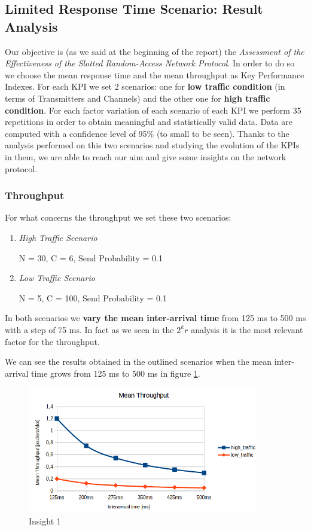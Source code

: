 \subsection{Limited Response Time Scenario: Result Analysis}
Our objective is (as we said at the beginning of the report) the \textit{Assessment of the Effectiveness of the Slotted Random-Access Network Protocol}. In order to do so we choose the mean response time and the mean throughput as Key Performance Indexes. For each KPI we set 2 scenarios: one for \textbf{low traffic condition} (in terms of Transmitters and Channels) and the other one for \textbf{high traffic condition}. For each factor variation of each scenario of each KPI we perform 35 repetitions in order to obtain meaningful and statistically valid data. Data are computed with a confidence level of 95\% (to small to be seen). Thanks to the analysis performed on this two scenarios and studying the evolution of the KPIs in them, we are able to reach our aim and give some insights on the network protocol. 

\subsubsection{Throughput}
For what concerns the throughput we set these two scenarios:
\begin{enumerate}
	\item \textit{High Traffic Scenario}
	
	N = 30, C = 6, Send Probability = 0.1
	\item \textit{Low Traffic Scenario}
	
	N = 5, C = 100, Send Probability = 0.1
\end{enumerate}

\noindent In both scenarios we \textbf{vary the mean inter-arrival time} from 125 ms to 500 ms with a step of 75 ms. In fact as we seen in the $2^kr$ analysis it is the most relevant factor for the throughput. 

\noindent We can see the results obtained in the outlined scenarios when the mean inter-arrival time grows from 125 ms to 500 ms in figure \ref{img: insight1_throughput}.

\begin{figure}[H]
	\centering
	\includegraphics[width=0.9\textwidth]{img/insight1_throughput.png}
	\caption{Insight 1}
	\label{img: insight1_throughput}
\end{figure}

